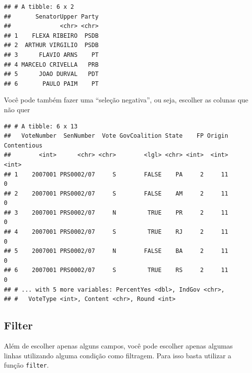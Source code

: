 \documentclass[]{book}
\newenvironment{Shaded}{\begin{snugshade}}{\end{snugshade}}
\newcommand{\KeywordTok}[1]{\textcolor[rgb]{0.13,0.29,0.53}{\textbf{#1}}}
\newcommand{\StringTok}[1]{\textcolor[rgb]{0.31,0.60,0.02}{#1}}
\newcommand{\CommentTok}[1]{\textcolor[rgb]{0.56,0.35,0.01}{\textit{#1}}}
\newcommand{\OperatorTok}[1]{\textcolor[rgb]{0.81,0.36,0.00}{\textbf{#1}}}
\newcommand{\NormalTok}[1]{#1}
\begin{document}
\begin{verbatim}
## # A tibble: 6 x 2
##       SenatorUpper Party
##              <chr> <chr>
## 1    FLEXA RIBEIRO  PSDB
## 2  ARTHUR VIRGILIO  PSDB
## 3      FLAVIO ARNS    PT
## 4 MARCELO CRIVELLA   PRB
## 5      JOAO DURVAL   PDT
## 6       PAULO PAIM    PT
\end{verbatim}

Você pode também fazer uma ``seleção negativa'', ou seja, escolher as
colunas que não quer

\begin{Shaded}
\end{Shaded}

\begin{verbatim}
## # A tibble: 6 x 13
##   VoteNumber  SenNumber  Vote GovCoalition State    FP Origin Contentious
##        <int>      <chr> <chr>        <lgl> <chr> <int>  <int>       <int>
## 1    2007001 PRS0002/07     S        FALSE    PA     2     11           0
## 2    2007001 PRS0002/07     S        FALSE    AM     2     11           0
## 3    2007001 PRS0002/07     N         TRUE    PR     2     11           0
## 4    2007001 PRS0002/07     S         TRUE    RJ     2     11           0
## 5    2007001 PRS0002/07     N        FALSE    BA     2     11           0
## 6    2007001 PRS0002/07     S         TRUE    RS     2     11           0
## # ... with 5 more variables: PercentYes <dbl>, IndGov <chr>,
## #   VoteType <int>, Content <chr>, Round <int>
\end{verbatim}

\subsection{Filter}\label{filter}

Além de escolher apenas alguns campos, você pode escolher apenas algumas
linhas utilizando alguma condição como filtragem. Para isso basta
utilizar a função \texttt{filter}.

\begin{Shaded}
\end{Shaded}
\end{document}
